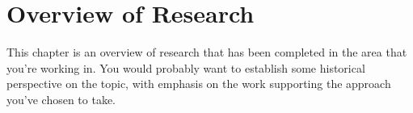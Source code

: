 \chapter{Overview of Research}
\label{ch:overview}

This chapter is an overview of research that has been completed in the
area that you're working in.  You would probably want to establish
some historical perspective on the topic, with emphasis on the work
supporting the approach you've chosen to take.

